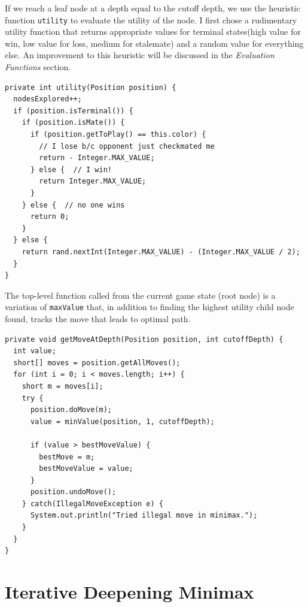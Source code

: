 \documentclass{article}
\begin{document}
\vspace{5mm}

If we reach a leaf node at a depth equal to the cutoff depth, we use the heuristic function \verb`utility` to evaluate the utility of the node. I first chose a rudimentary utility function that returns appropriate values for terminal states(high value for win, low value for loss, medium for stalemate) and a random value for everything else. An improvement to this heuristic will be discussed in the {\it Evaluation Functions} section.

\vspace{5mm}

\begin{lstlisting}
private int utility(Position position) {
  nodesExplored++;
  if (position.isTerminal()) {
    if (position.isMate()) {
      if (position.getToPlay() == this.color) {
        // I lose b/c opponent just checkmated me
        return - Integer.MAX_VALUE;
      } else {  // I win!
        return Integer.MAX_VALUE;
      }
    } else {  // no one wins
      return 0;
    }
  } else {
    return rand.nextInt(Integer.MAX_VALUE) - (Integer.MAX_VALUE / 2);
  }
}
\end{lstlisting}

\vspace{5mm}

The top-level function called from the current game state (root node) is a variation of \verb`maxValue` that, in addition to finding the highest utility child node found, tracks the move that leads to optimal path. 

\vspace{5mm}

\begin{lstlisting}
private void getMoveAtDepth(Position position, int cutoffDepth) {
  int value;
  short[] moves = position.getAllMoves();
  for (int i = 0; i < moves.length; i++) {
    short m = moves[i];
    try {
      position.doMove(m);
      value = minValue(position, 1, cutoffDepth);
      
      if (value > bestMoveValue) {
        bestMove = m;
        bestMoveValue = value;
      }
      position.undoMove();
    } catch(IllegalMoveException e) {
      System.out.println("Tried illegal move in minimax.");
    }
  }
}
\end{lstlisting}

\section{Iterative Deepening Minimax}
\end{document}
